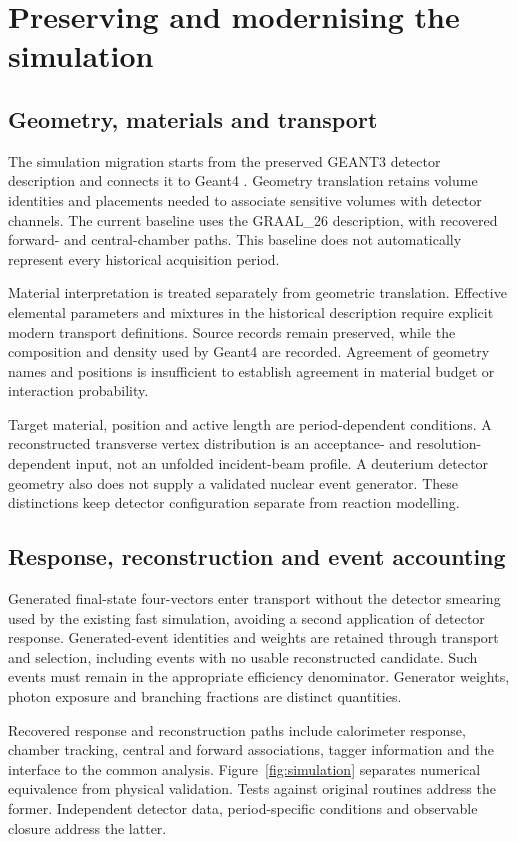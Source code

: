 \documentclass[10pt,aps,prd,amsmath,amssymb,superscriptaddress,twocolumn,nofootinbib,showpacs,showkeys,preprintnumbers,amsfonts,notitlepage,floatfix]{revtex4-2}
\begin{document}
\section{Preserving and modernising the simulation}
\subsection{Geometry, materials and transport}
The simulation migration starts from the preserved GEANT3 detector description \citep{GEANTManual} and connects it to Geant4 \citep{Agostinelli2003}. Geometry translation retains volume identities and placements needed to associate sensitive volumes with detector channels. The current baseline uses the GRAAL\_26 description, with recovered forward- and central-chamber paths. This baseline does not automatically represent every historical acquisition period.

Material interpretation is treated separately from geometric translation. Effective elemental parameters and mixtures in the historical description require explicit modern transport definitions. Source records remain preserved, while the composition and density used by Geant4 are recorded. Agreement of geometry names and positions is insufficient to establish agreement in material budget or interaction probability.

Target material, position and active length are period-dependent conditions. A reconstructed transverse vertex distribution is an acceptance- and resolution-dependent input, not an unfolded incident-beam profile. A deuterium detector geometry also does not supply a validated nuclear event generator. These distinctions keep detector configuration separate from reaction modelling.

\subsection{Response, reconstruction and event accounting}
Generated final-state four-vectors enter transport without the detector smearing used by the existing fast simulation, avoiding a second application of detector response. Generated-event identities and weights are retained through transport and selection, including events with no usable reconstructed candidate. Such events must remain in the appropriate efficiency denominator. Generator weights, photon exposure and branching fractions are distinct quantities.

Recovered response and reconstruction paths include calorimeter response, chamber tracking, central and forward associations, tagger information and the interface to the common analysis. Figure~\ref{fig:simulation} separates numerical equivalence from physical validation. Tests against original routines address the former. Independent detector data, period-specific conditions and observable closure address the latter.
\end{document}
